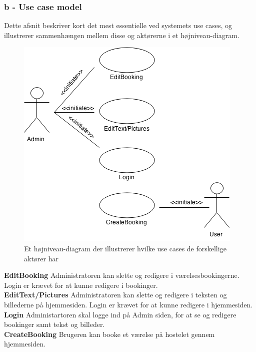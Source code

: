 \documentclass[12pt,a4paper]{article}
\begin{document}
\subsubsection{b - Use case model}
Dette afsnit beskriver kort det mest essentielle ved systemets use cases, og illustrerer sammenhængen mellem disse og aktørerne i et højniveau-diagram. 
\begin{figure}[H]
\centering
\includegraphics[scale=0.7]{hoejniveau.png}
\caption{Et højniveau-diagram der illustrerer hvilke use cases de forskellige aktører har}
\end{figure}
\textbf{EditBooking}  Administratoren kan slette og redigere i værelsesbookingerne. Login er krævet for at kunne redigere i bookinger.\\
\textbf{EditText/Pictures} Administratoren kan slette og redigere i teksten og billederne på hjemmesiden. Login er krævet for at kunne redigere i hjemmesiden.\\
\textbf{Login} Administartoren skal logge ind på Admin siden, for at se og redigere bookinger samt tekst og billeder.\\
\textbf{CreateBooking} Brugeren kan booke et værelse på hostelet gennem hjemmesiden.\\
\newpage
\end{document}
